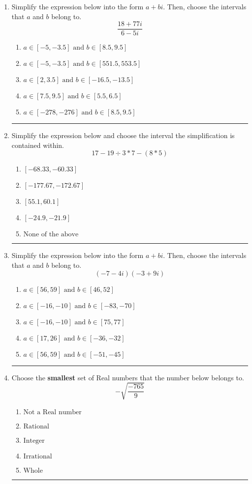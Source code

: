 \documentclass[14pt]{extbook}
\newcommand{\litem}[1]{\item#1\hspace*{-1cm}\rule{\textwidth}{0.4pt}}
\begin{document}
\begin{enumerate}
{\begin{enumerate}[label=\Alph*.]
\end{enumerate} }
\litem{
Simplify the expression below into the form $a+bi$. Then, choose the intervals that $a$ and $b$ belong to.\[ \frac{18 + 77 i}{6 - 5 i} \]\begin{enumerate}[label=\Alph*.]
\item \( a \in [-5, -3.5] \text{ and } b \in [8.5, 9.5] \)
\item \( a \in [-5, -3.5] \text{ and } b \in [551.5, 553.5] \)
\item \( a \in [2, 3.5] \text{ and } b \in [-16.5, -13.5] \)
\item \( a \in [7.5, 9.5] \text{ and } b \in [5.5, 6.5] \)
\item \( a \in [-278, -276] \text{ and } b \in [8.5, 9.5] \)

\end{enumerate} }
\litem{
Simplify the expression below and choose the interval the simplification is contained within.\[ 17 - 19 \div 3 * 7 - (8 * 5) \]\begin{enumerate}[label=\Alph*.]
\item \( [-68.33, -60.33] \)
\item \( [-177.67, -172.67] \)
\item \( [55.1, 60.1] \)
\item \( [-24.9, -21.9] \)
\item \( \text{None of the above} \)

\end{enumerate} }
\litem{
Simplify the expression below into the form $a+bi$. Then, choose the intervals that $a$ and $b$ belong to.\[ (-7 - 4 i)(-3 + 9 i) \]\begin{enumerate}[label=\Alph*.]
\item \( a \in [56, 59] \text{ and } b \in [46, 52] \)
\item \( a \in [-16, -10] \text{ and } b \in [-83, -70] \)
\item \( a \in [-16, -10] \text{ and } b \in [75, 77] \)
\item \( a \in [17, 26] \text{ and } b \in [-36, -32] \)
\item \( a \in [56, 59] \text{ and } b \in [-51, -45] \)

\end{enumerate} }
\litem{
Choose the \textbf{smallest} set of Real numbers that the number below belongs to.\[ -\sqrt{\frac{-765}{9}} \]\begin{enumerate}[label=\Alph*.]
\item \( \text{Not a Real number} \)
\item \( \text{Rational} \)
\item \( \text{Integer} \)
\item \( \text{Irrational} \)
\item \( \text{Whole} \)


\end{enumerate}}
\end{enumerate}
\end{document}
